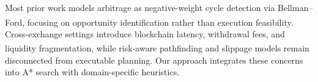 Most prior work models arbitrage as negative-weight cycle detection via Bellman--Ford\textsuperscript{\cite{bellman1958routing,cormen2009introduction,oanta2023crypto,defiposer2021,mmbf2024,rich2025,fang2022cryptocurrency}}, focusing on opportunity identification rather than execution feasibility. Cross-exchange settings introduce blockchain latency, withdrawal fees, and liquidity fragmentation\textsuperscript{\cite{obadia2021flashbots,optimalexecution2024}}, while risk-aware pathfinding\textsuperscript{\cite{nikolova2008stochastic}} and slippage models\textsuperscript{\cite{almgren2001optimal}} remain disconnected from executable planning. Our approach integrates these concerns into A* search with domain-specific heuristics.
